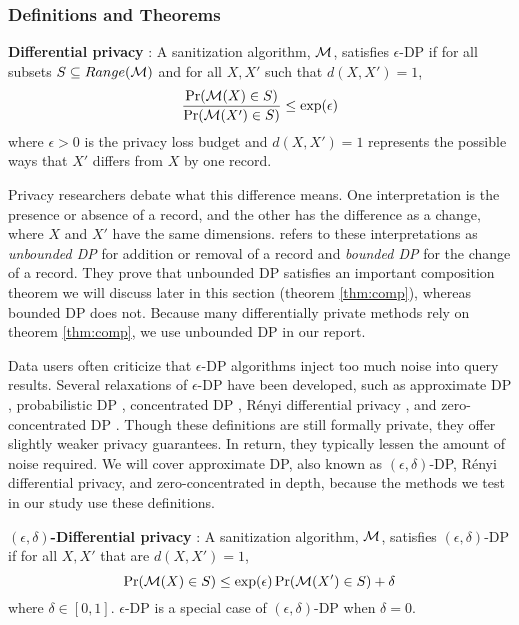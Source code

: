 \subsubsection{Definitions and Theorems}\label{subsec:def}
\begin{defn}\label{def:dp} \textbf{Differential privacy} \citep{dwork2006calibrating}:
A sanitization algorithm, $\mathcal{M}$, satisfies $\epsilon$-DP if for all subsets $S\subseteq Range(\mathcal{M})$ and for all $X,X'$ such that $d(X,X')=1$, 
    \begin{equation}\label{eqn:dp}
        \frac{\Pr(\mathcal{M}( X) \in S)}{ \Pr(\mathcal{M}( X')\in S)}\le \exp(\epsilon)
    \end{equation}
    \noindent where $\epsilon>0$ is the privacy loss budget and $d(X,X')=1$ represents the possible ways that $X'$ differs from $X$ by one record.
\end{defn}

Privacy researchers debate what this difference means. One interpretation is the presence or absence of a record, and the other has the difference as a change, where $X$ and $X'$ have the same dimensions. \citet{li2016differential} refers to these interpretations as \textit{unbounded DP} for addition or removal of a record and \textit{bounded DP} for the change of a record. They prove that unbounded DP satisfies an important composition theorem we will discuss later in this section (theorem \ref{thm:comp}), whereas bounded DP does not. Because many differentially private methods rely on theorem \ref{thm:comp}, we use unbounded DP in our report.

Data users often criticize that $\epsilon$-DP algorithms inject too much noise into query results. Several relaxations of $\epsilon$-DP have been developed, such as approximate DP \citep{dwork2006our}, probabilistic DP \citep{machanavajjhala2008privacy}, concentrated DP \citep{dwork2016concentrated}, R\'enyi differential privacy \citep{mironov2017renyi}, and zero-concentrated DP \citep{bun2016concentrated}. Though these definitions are still formally private, they offer slightly weaker privacy guarantees. In return, they typically lessen the amount of noise required. We will cover approximate DP, also known as $(\epsilon, \delta)$-DP, R\'enyi differential privacy, and zero-concentrated in depth, because the methods we test in our study use these definitions.

\begin{defn}\label{def:adp} \textbf{$(\epsilon, \delta)$-Differential privacy} \citep{dwork2006our}:
A sanitization algorithm, $\mathcal{M}$, satisfies $(\epsilon, \delta)$-DP if for all $X, X'$ that are $d(X,X')=1$,
    \begin{equation}\label{eqn:adp}
        \Pr(\mathcal{M}( X) \in S)\le \exp(\epsilon) \Pr(\mathcal{M}( X')\in S) + \delta
    \end{equation}
    where $\delta\in [0,1]$. $\epsilon$-DP is a special case of $(\epsilon, \delta)$-DP when $\delta=0$.
\end{defn}

